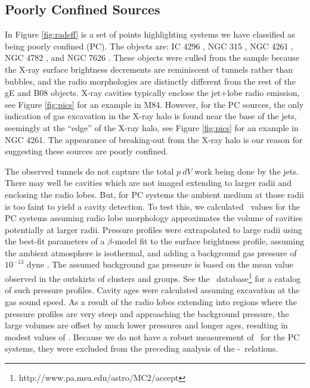 \documentclass{emulateapj}
\begin{document}
\subsection{Poorly Confined Sources}
\label{sec:jet}

In Figure \ref{fig:radeff} is a set of points highlighting systems we
have classified as being poorly confined (PC). The objects are: IC
4296 \citep{1988ApJ...324..198K, 2003ApJ...585..677P}, NGC 315
\citep{1979ApJ...228L...9B, 1981A&A....95..250W}, NGC 4261
\citep{1997ApJ...484..186J, 2000ApJ...534..165J}, NGC 4782
\citep{2007ApJ...664..804M}, and NGC 7626 \citep{1985ApJ...291...32B}.
These objects were culled from the sample because the X-ray surface
brightness decrements are reminiscent of tunnels rather than bubbles,
and the radio morphologies are distinctly different from the rest of
the gE and B08 objects. X-ray cavities typically enclose the jet+lobe
radio emission, see Figure \ref{fig:pics} for an example in
M84. However, for the PC sources, the only indication of gas
excavation in the X-ray halo is found near the base of the jets,
seemingly at the ``edge'' of the X-ray halo, see Figure \ref{fig:pics}
for an example in NGC 4261. The appearance of breaking-out from the
X-ray halo is our reason for suggesting these sources are poorly
confined.

The observed tunnels do not capture the total $p~dV$ work being done
by the jets. There may well be cavities which are not imaged extending
to larger radii and enclosing the radio lobes. But, for PC systems the
ambient medium at those radii is too faint to yield a cavity
detection. To test this, we calculated \pcav\ values for the PC
systems assuming radio lobe morphology approximates the volume of
cavities potentially at larger radii. Pressure profiles were
extrapolated to large radii using the best-fit parameters of a
$\beta$-model \citep{betamodel} fit to the surface brightness profile,
assuming the ambient atmosphere is isothermal, and adding a background
gas pressure of $10^{-13}$ dyne \pcmsq. The assumed background gas
pressure is based on the mean value observed in the outskirts of
clusters and groups. See the
\accept\ database\footnote{http://www.pa.msu.edu/astro/MC2/accept} for
a catalog of such pressure profiles. Cavity ages were calculated
assuming excavation at the gas sound speed. As a result of the radio
lobes extending into regions where the pressure profiles are very
steep and approaching the background pressure, the large volumes are
offset by much lower pressures and longer ages, resulting in modest
values of \pcav. Because we do not have a robust measurement of
\pcav\ for the PC systems, they were excluded from the preceding
analysis of the \pjet-\prad\ relations.
\end{document}
